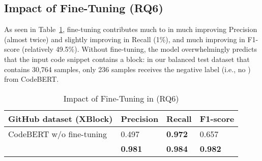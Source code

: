 \subsection{Impact of Fine-Tuning (RQ6)}
\label{sec:rq6}



As seen in Table~\ref{tab:codebert}, fine-tuning contributes much to
{\tool} in much improving Precision (almost twice) and slightly
improving in Recall (1\%), and much improving in F1-score (relatively
49.5\%). Without fine-tuning, the model 
overwhelmingly predicts that the input code snippet contains a
 block: in our balanced test dataset that contains
30,764 samples, only 236 samples receives the negative label (i.e., no
) from CodeBERT.



\begin{table}[t]%
  \caption{Impact of Fine-Tuning in {\tool} (RQ6)}
  \vspace{-12pt}
  \small
	\begin{center}
		\renewcommand{\arraystretch}{1}
		\begin{tabular}{| p{3.15cm}<{\centering} | p{1.2cm}<{\centering} | p{1.2cm}<{\centering}| p{1.2cm}<{\centering}|}
		  \hline
			GitHub dataset (XBlock)  & Precision  &  Recall & F1-score \\
			\hline
			CodeBERT w/o fine-tuning & 0.497  & \textbf{0.972}   & 0.657\\
			\hline
			\tool   &  \textbf{0.981} &  {\bf 0.984} & \textbf{0.982}\\
			\hline
		\end{tabular}
		\label{tab:codebert}
	\end{center}
\end{table}
